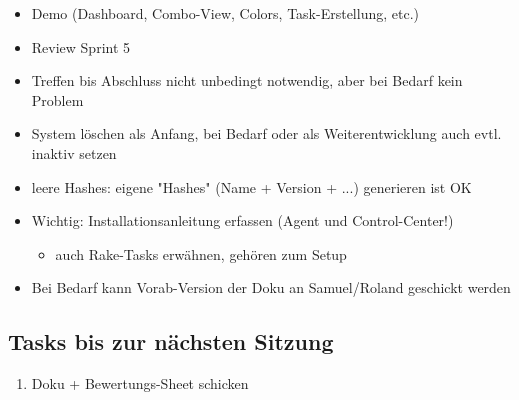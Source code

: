 \documentclass[class=scrbook,crop=false]{standalone}
\begin{document}
	\begin{itemize}
        \item Demo (Dashboard, Combo-View, Colors, Task-Erstellung, etc.)
        \item Review Sprint 5
        \item Treffen bis Abschluss nicht unbedingt notwendig, aber bei Bedarf kein Problem
        \item System löschen als Anfang, bei Bedarf oder als Weiterentwicklung auch evtl. inaktiv setzen
        \item leere Hashes: eigene "Hashes" (Name + Version + ...) generieren ist OK
        \item Wichtig: Installationsanleitung erfassen (Agent und Control-Center!)
        \begin{itemize}
            \item auch Rake-Tasks erwähnen, gehören zum Setup
        \end{itemize}
        \item Bei Bedarf kann Vorab-Version der Doku an Samuel/Roland geschickt werden
    \end{itemize}
    
    \subsection*{Tasks bis zur nächsten Sitzung}
    
    \begin{enumerate}
        \item Doku + Bewertungs-Sheet schicken
    \end{enumerate}
\end{document}
